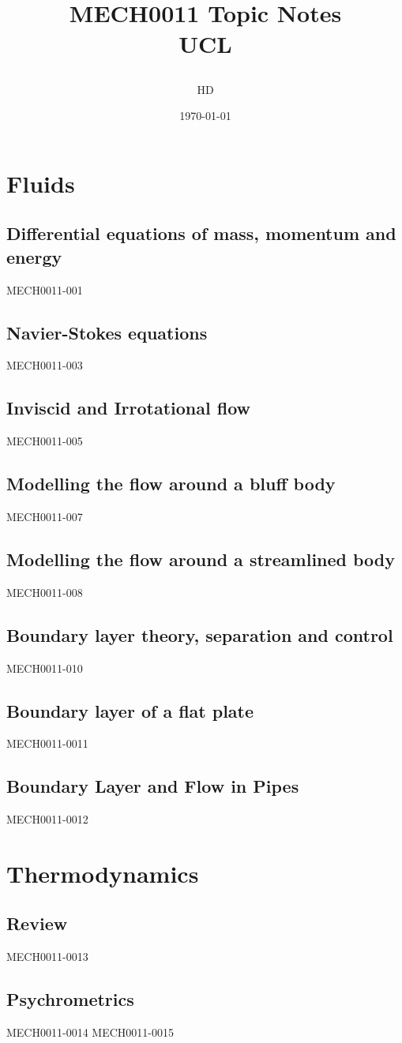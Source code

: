 \documentclass[12pt,a4paper, twoside]{report}
\begin{document}
\title{
  {MECH0011 Topic Notes}\\
  {\large UCL}
  \author{HD}
  \date{\today}
}
\maketitle
\tableofcontents
\part{Fluids}
\chapter{Differential equations of mass, momentum and energy}
{MECH0011-001}
\chapter{Navier-Stokes equations}
{MECH0011-003}
\chapter{Inviscid and Irrotational flow}
{MECH0011-005}
\chapter{Modelling the flow around a bluff body}
{MECH0011-007}
\chapter{Modelling the flow around a streamlined body}
{MECH0011-008}
\chapter{Boundary layer theory, separation and control}
{MECH0011-010}
\chapter{Boundary layer of a flat plate}
{MECH0011-0011}
\chapter{Boundary Layer and Flow in Pipes}
{MECH0011-0012}
\part{Thermodynamics}
\chapter{Review}
{MECH0011-0013}
\chapter{Psychrometrics}
{MECH0011-0014}
{MECH0011-0015}
\end{document}
